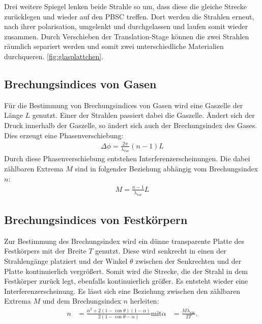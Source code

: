 Drei weitere Spiegel lenken beide Strahle so um, dass diese die gleiche Strecke zurücklegen und wieder auf
den PBSC treffen. Dort werden die Strahlen erneut, nach ihrer polarisation,
umgelenkt und durchgelassen und laufen somit wieder zusammen.
Durch Verschieben der Translation-Stage können die zwei Strahlen räumlich separiert
werden und somit zwei unterschiedliche Materialien durchqueren.
\ref{fig:glasplattchen}.


\subsection{Brechungsindices von Gasen}
Für die Bestimmung von Brechungsindices von Gasen wird eine Gaszelle
der Länge $L$ genutzt. Einer der Strahlen passiert dabei die Gaszelle.
Ändert sich der Druck innerhalb der Gaszelle, so ändert sich auch
der Brechungsindex des Gases. Dies erzeugt eine Phasenverschiebung:
\begin{align}
  \Delta\phi=\frac{2\pi}{\lambda_\mathrm{vac}}(n-1)L
\end{align}
Durch diese Phasenverschiebung entstehen Interferenzerscheinungen.
Die dabei zählbaren Extrema $M$ sind in folgender Beziehung abhängig
vom Brechungsindex $n$:
\begin{align}
  M=\frac{n-1}{\lambda_\mathrm{vac}}L\label{eqn:gas}
\end{align}

\subsection{Brechungsindices von Festkörpern}
Zur Bestimmung des Brechungsindex wird ein dünne transparente
Platte des Festkörpers mit der Breite $T$ genutzt. Diese wird senkrecht in einen der Strahlengänge
platziert und der Winkel $\theta$ zwischen der Senkrechten und der Platte kontinuierlich vergrößert. Somit wird die
Strecke, die der Strahl in dem Festkörper zurück legt, ebenfalls kontinuierlich größer.
Es entsteht wieder eine Interferenzerscheinung.
Es lässt sich eine Beziehung zwischen den zählbaren Extrema $M$
und dem Brechungsindex $n$ herleiten:
\begin{align}%
  n&=\frac{\alpha^2+2(1-\cos\theta)(1-\alpha)}{2(1-\cos\theta-\alpha)}
  \text{mit} \alpha&= \frac{M\lambda_\mathrm{vac}}{2T}.
\end{align}
